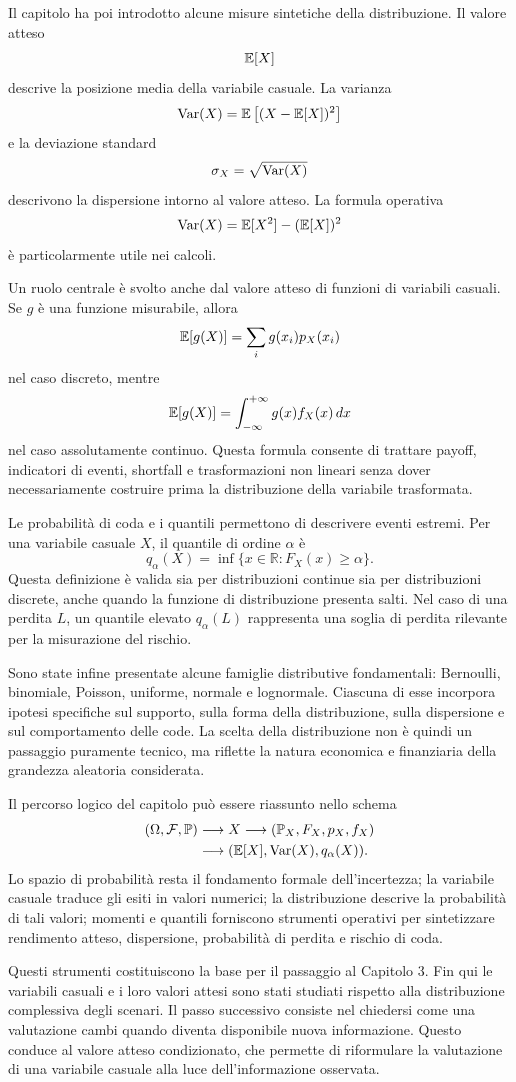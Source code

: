 Il capitolo ha poi introdotto alcune misure sintetiche della distribuzione. Il
valore atteso
\[
\mathbb{E}[X]
\]
descrive la posizione media della variabile casuale. La varianza
\[
\operatorname{Var}(X)=\mathbb{E}\left[(X-\mathbb{E}[X])^2\right]
\]
e la deviazione standard
\[
\sigma_X=\sqrt{\operatorname{Var}(X)}
\]
descrivono la dispersione intorno al valore atteso. La formula operativa
\[
\operatorname{Var}(X)=\mathbb{E}[X^2]-(\mathbb{E}[X])^2
\]
\`{e} particolarmente utile nei calcoli.

Un ruolo centrale \`{e} svolto anche dal valore atteso di funzioni di variabili
casuali. Se $g$ \`{e} una funzione misurabile, allora
\[
\mathbb{E}[g(X)]
=
\sum_i g(x_i)p_X(x_i)
\]
nel caso discreto, mentre
\[
\mathbb{E}[g(X)]
=
\int_{-\infty}^{+\infty}g(x)f_X(x)\,dx
\]
nel caso assolutamente continuo. Questa formula consente di trattare payoff,
indicatori di eventi, shortfall e trasformazioni non lineari senza dover
necessariamente costruire prima la distribuzione della variabile trasformata.

Le probabilit\`{a} di coda e i quantili permettono di descrivere eventi estremi.
Per una variabile casuale $X$, il quantile di ordine $\alpha$ \`{e}
\[
q_\alpha(X)
=
\inf\{x\in\mathbb{R}:F_X(x)\geq \alpha\}.
\]
Questa definizione \`{e} valida sia per distribuzioni continue sia per
distribuzioni discrete, anche quando la funzione di distribuzione presenta
salti. Nel caso di una perdita $L$, un quantile elevato $q_\alpha(L)$ rappresenta
una soglia di perdita rilevante per la misurazione del rischio.

Sono state infine presentate alcune famiglie distributive fondamentali:
Bernoulli, binomiale, Poisson, uniforme, normale e lognormale. Ciascuna di esse
incorpora ipotesi specifiche sul supporto, sulla forma della distribuzione, sulla
dispersione e sul comportamento delle code. La scelta della distribuzione non
\`{e} quindi un passaggio puramente tecnico, ma riflette la natura economica e
finanziaria della grandezza aleatoria considerata.

Il percorso logico del capitolo pu\`{o} essere riassunto nello schema
\[
\begin{aligned}
(\Omega,\mathcal{F},\mathbb{P})&\longrightarrow X
\longrightarrow (\mathbb{P}_X,F_X,p_X,f_X)\\
&\longrightarrow (\mathbb{E}[X],\operatorname{Var}(X),q_\alpha(X)).
\end{aligned}
\]
Lo spazio di probabilit\`{a} resta il fondamento formale dell'incertezza; la
variabile casuale traduce gli esiti in valori numerici; la distribuzione descrive
la probabilit\`{a} di tali valori; momenti e quantili forniscono strumenti
operativi per sintetizzare rendimento atteso, dispersione, probabilit\`{a} di
perdita e rischio di coda.

Questi strumenti costituiscono la base per il passaggio al Capitolo 3. Fin qui
le variabili casuali e i loro valori attesi sono stati studiati rispetto alla
distribuzione complessiva degli scenari. Il passo successivo consiste nel
chiedersi come una valutazione cambi quando diventa disponibile nuova
informazione. Questo conduce al valore atteso condizionato, che permette di
riformulare la valutazione di una variabile casuale alla luce
dell'informazione osservata.
